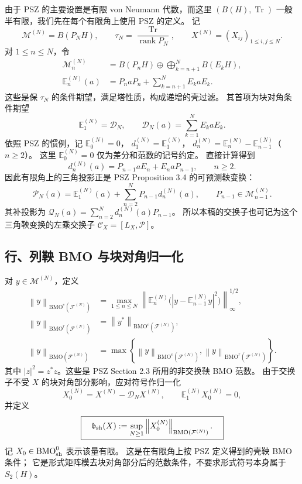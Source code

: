 \documentclass[UTF8,11pt,a4paper,fontset=fandol]{ctexart}
\theoremstyle{remark}
\newcommand{\Tr}{\operatorname{Tr}}
\newcommand{\PP}{\mathcal P}
\newcommand{\QQ}{\mathcal Q}
\newcommand{\DD}{\mathcal D}
\newcommand{\CC}{\mathcal C}
\newcommand{\norm}[1]{\left\lVert #1\right\rVert}
\DeclareMathOperator{\rank}{rank}
\numberwithin{equation}{section}
\begin{document}
由于 PSZ 的主要设置是有限 von Neumann 代数，而这里
$(B(H),\Tr)$ 一般半有限，我们先在每个有限角上使用 PSZ 的定义。
记
\[
 \mathcal M^{(N)}=B(P_NH),\qquad
 \tau_N=\frac{\Tr}{\rank P_N},\qquad
 X^{(N)}=(X_{ij})_{1\leq i,j\leq N}.
\]
对 $1\leq n\leq N$，令
\begin{align}
 \mathcal M_n^{(N)}
 &=B(P_nH)\oplus\bigoplus_{k=n+1}^{N}B(E_kH),\label{eq:shell-algebra}\\
 \mathbb E_n^{(N)}(a)
 &=P_naP_n+\sum_{k=n+1}^{N}E_kaE_k.\label{eq:shell-expectation}
\end{align}
这些是保 $\tau_N$ 的条件期望，满足塔性质，构成递增的壳过滤。
其首项为块对角条件期望
\[
 \mathbb E_1^{(N)}=\DD_N,\qquad
 \DD_N(a)=\sum_{k=1}^{N}E_kaE_k.
\]
依照 PSZ 的惯例，记 $\mathbb E_0^{(N)}=0$，
$d_1^{(N)}=\mathbb E_1^{(N)}$，
$d_n^{(N)}=\mathbb E_n^{(N)}-\mathbb E_{n-1}^{(N)}$（$n\geq2$）。
这里 $\mathbb E_0^{(N)}=0$ 仅为差分和范数的记号约定。
直接计算得到
\begin{equation}\label{eq:shell-difference}
 d_n^{(N)}(a)=P_{n-1}aE_n+E_naP_{n-1},\qquad n\geq2.
\end{equation}
因此有限角上的三角投影正是 PSZ Proposition 3.4 的可预测鞅变换：
\begin{equation}\label{eq:martingale-transform}
 \PP_N(a)=\mathbb E_1^{(N)}(a)
       +\sum_{n=2}^{N}P_{n-1}d_n^{(N)}(a),
 \qquad P_{n-1}\in\mathcal M_{n-1}^{(N)}.
\end{equation}
其补投影为 $\QQ_N(a)=\sum_{n=2}^{N}d_n^{(N)}(a)P_{n-1}$。
所以本稿的交换子也可记为这个三角鞅变换的左乘交换子
$\CC_X=[L_X,\PP]$。

\subsection{行、列鞅 BMO 与块对角归一化}

对 $y\in\mathcal M^{(N)}$，定义
\begin{align}
 \norm y_{\mathrm{BMO}^{c}(\mathcal F^{(N)})}
 &=\max_{1\leq n\leq N}
 \norm{\mathbb E_n^{(N)}
   \bigl(|y-\mathbb E_{n-1}^{(N)}y|^2\bigr)}_\infty^{1/2},\label{eq:martingale-bmoc}\\
 \norm y_{\mathrm{BMO}^{r}(\mathcal F^{(N)})}
 &=\norm{y^*}_{\mathrm{BMO}^{c}(\mathcal F^{(N)})},\label{eq:martingale-bmor}\\
 \norm y_{\mathrm{BMO}(\mathcal F^{(N)})}
 &=\max\left\{
 \norm y_{\mathrm{BMO}^{c}(\mathcal F^{(N)})},
 \norm y_{\mathrm{BMO}^{r}(\mathcal F^{(N)})}\right\}.\label{eq:martingale-bmo}
\end{align}
其中 $|z|^2=z^*z$。这些是 PSZ Section 2.3 所用的非交换鞅 BMO 范数。
由于交换子不受 $X$ 的块对角部分影响，应对符号作归一化
\[
 X_0^{(N)}=X^{(N)}-\DD_NX^{(N)},\qquad
 \mathbb E_1^{(N)}X_0^{(N)}=0,
\]
并定义
\begin{equation}\label{eq:bmo-zero}
 \boxed{\quad
 \mathfrak b_{\rm sh}(X)
 :=\sup_{N\geq1}\norm{X_0^{(N)}}_{\mathrm{BMO}(\mathcal F^{(N)})}.
 \quad}
\end{equation}
记 $X_0\in\mathrm{BMO}_{\rm sh}^{0}$ 表示该量有限。
这是在有限角上按 PSZ 定义得到的壳鞅 BMO 条件；
它是形式矩阵模去块对角部分后的范数条件，不要求形式符号本身属于 $S_2(H)$。
\end{document}
